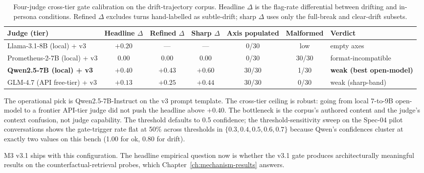 \begin{table}[H]
  \centering
  \small
  \caption{Four-judge cross-tier gate calibration on the drift-trajectory corpus. Headline $\Delta$ is the flag-rate differential between drifting and in-persona conditions. Refined $\Delta$ excludes turns hand-labelled as subtle-drift; sharp $\Delta$ uses only the full-break and clear-drift subsets.}
  \label{tab:gate-calibration}
  \begin{tabularx}{\textwidth}{l c c c c c X}
    \toprule
    \textbf{Judge (tier)}            & \textbf{Headline $\Delta$} & \textbf{Refined $\Delta$} & \textbf{Sharp $\Delta$} & \textbf{Axis populated} & \textbf{Malformed} & \textbf{Verdict} \\
    \midrule
    Llama-3.1-8B (local) + v3        & $+0.20$ & ---     & ---     & 0/30  & low  & empty axes \\
    Prometheus-2-7B (local) + v3     & $0.00$  & $0.00$  & $0.00$  & 0/30  & 30/30 & format-incompatible \\
    \textbf{Qwen2.5-7B (local) + v3} & $\mathbf{+0.40}$ & $+0.43$ & $+0.60$ & 30/30 & 1/30  & \textbf{weak (best open-model)} \\
    GLM-4.7 (API free-tier) + v3     & $+0.13$ & $+0.25$ & $+0.44$ & 30/30 & 0/30  & weak (sharp-band) \\
    \bottomrule
  \end{tabularx}
\end{table}

The operational pick is Qwen2.5-7B-Instruct on the v3 prompt template. The cross-tier ceiling is robust: going from local 7-to-9B open-model to a frontier API-tier judge did not push the headline above $+0.40$. The bottleneck is the corpus's authored content and the judge's context confusion, not judge capability. The threshold defaults to 0.5 confidence; the threshold-sensitivity sweep on the Spec-04 pilot conversations shows the gate-trigger rate flat at 50\% across thresholds in $\{0.3, 0.4, 0.5, 0.6, 0.7\}$ because Qwen's confidences cluster at exactly two values on this bench (1.00 for ok, 0.80 for drift).

M3 v3.1 ships with this configuration. The headline empirical question now is whether the v3.1 gate produces architecturally meaningful results on the counterfactual-retrieval probes, which Chapter~\ref{ch:mechanism-results} answers.
